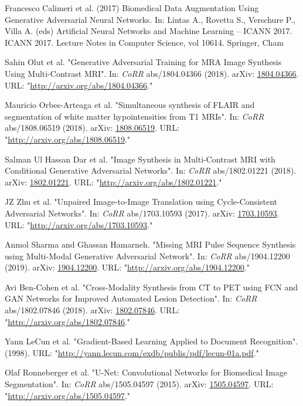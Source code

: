 \begin{thebibliography}{100}
Francesco Calimeri et al. (2017) Biomedical Data Augmentation Using Generative Adversarial Neural Networks. In: Lintas A., Rovetta S., Verschure P., Villa A. (eds) Artificial Neural Networks and Machine Learning – ICANN 2017. ICANN 2017. Lecture Notes in Computer Science, vol 10614. Springer, Cham

Sahin Olut et al. "{Generative Adversarial Training for MRA Image Synthesis Using Multi-Contrast MRI}".
In: \textit{CoRR} abs/1804.04366
(2018). arXiv: \href{http://arxiv.org/abs/1804.04366}{1804.04366}. URL: "\url{http://arxiv.org/abs/1804.04366}."

Mauricio Orbes-Arteaga et al. "{Simultaneous synthesis of FLAIR and segmentation of white matter hypointensities from T1 MRIs}".
In: \textit{CoRR} abs/1808.06519
(2018). arXiv: \href{http://arxiv.org/abs/1808.06519}{1808.06519}. URL: "\url{http://arxiv.org/abs/1808.06519}."

Salman Ul Hassan Dar et al. "{Image Synthesis in Multi-Contrast MRI with Conditional Generative Adversarial Networks}".
In: \textit{CoRR} abs/1802.01221
(2018). arXiv: \href{http://arxiv.org/abs/1802.01221}{1802.01221}. URL: "\url{http://arxiv.org/abs/1802.01221}."

JZ Zhu et al. "{Unpaired Image-to-Image Translation using Cycle-Consistent Adversarial Networks}".
In: \textit{CoRR} abs/1703.10593
(2017). arXiv: \href{http://arxiv.org/abs/1703.10593}{1703.10593}. URL: "\url{http://arxiv.org/abs/1703.10593}."

Anmol Sharma and Ghassan Hamarneh. "{Missing MRI Pulse Sequence Synthesis using Multi-Modal Generative Adversarial Network}".
In: \textit{CoRR} abs/1904.12200
(2019). arXiv: \href{http://arxiv.org/abs/1904.12200}{1904.12200}. URL: "\url{http://arxiv.org/abs/1904.12200}."

Avi Ben-Cohen et al. "{Cross-Modality Synthesis from CT to PET using FCN and GAN Networks for Improved Automated Lesion Detection}".
In: \textit{CoRR} abs/1802.07846
(2018). arXiv: \href{http://arxiv.org/abs/1802.07846}{1802.07846}. URL: "\url{http://arxiv.org/abs/1802.07846}."

Yann LeCun et al. "{Gradient-Based Learning Applied to Document Recognition}". (1998). URL: "\url{http://yann.lecun.com/exdb/publis/pdf/lecun-01a.pdf}."

Olaf Ronneberger et al. "{U-Net: Convolutional Networks for Biomedical Image Segmentation}".
In: \textit{CoRR} abs/1505.04597
(2015). arXiv: \href{http://arxiv.org/abs/1505.04597}{1505.04597}. URL: "\url{http://arxiv.org/abs/1505.04597}."


\end{thebibliography}
